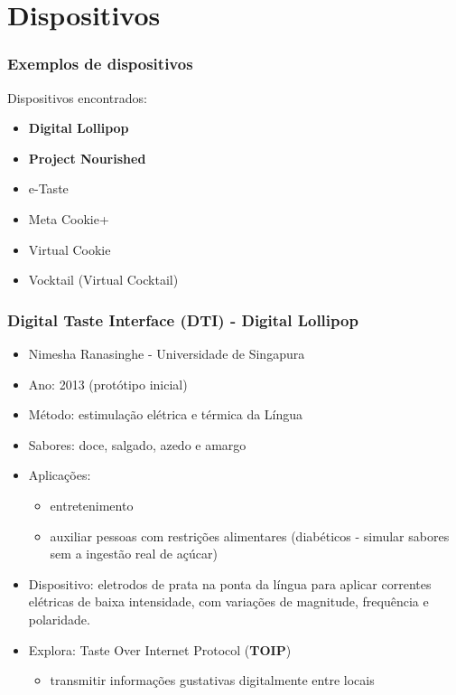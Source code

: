\documentclass{beamer}
\begin{document}
\section{Dispositivos}
\begin{frame}
  \frametitle{Exemplos de dispositivos}
  Dispositivos encontrados:
  \begin{itemize}
    \item \textbf{Digital Lollipop}
    \item \textbf{Project Nourished}
    \item e-Taste
    \item Meta Cookie+
    \item Virtual Cookie
    \item Vocktail (Virtual Cocktail)
  \end{itemize}
\end{frame}

\begin{frame}
  \frametitle{Digital Taste Interface (DTI) - Digital Lollipop}
  \begin{itemize}
    \item Nimesha Ranasinghe - Universidade de Singapura
    \item Ano: 2013 (protótipo inicial)
    \item Método: estimulação elétrica  e térmica da Língua
    \item Sabores: doce, salgado, azedo e amargo
    \item Aplicações:
    \begin{itemize}
      \item entretenimento
      \item auxiliar pessoas com restrições alimentares (diabéticos - simular sabores sem a ingestão real de açúcar)
    \end{itemize}
    \item Dispositivo: eletrodos de prata na ponta da língua para aplicar correntes elétricas de baixa intensidade, com variações de magnitude, frequência e polaridade.  
    \item Explora: Taste Over Internet Protocol (\textbf{TOIP})
    \begin{itemize}
      \item transmitir informações gustativas digitalmente entre locais
    \end{itemize}
  \end{itemize}
  \begin{flushright}
    \scriptsize
    \cite{ranasingheTongueMountedInterface2012}
    \cite{ranasingheVirtualTasteDigital2023}
  \end{flushright}
\end{frame}
\end{document}
